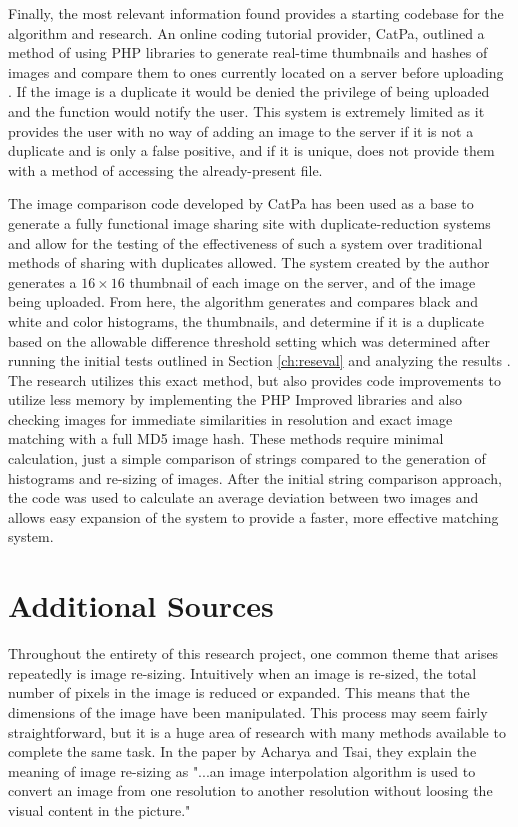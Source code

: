 Finally, the most relevant information found provides a starting codebase for the algorithm and research. An online coding tutorial provider, CatPa, outlined a method of using PHP libraries to generate real-time thumbnails and hashes of images and compare them to ones currently located on a server before uploading \cite{catpa:gdcode}. If the image is a duplicate it would be denied the privilege of being uploaded and the function would notify the user. This system is extremely limited as it provides the user with no way of adding an image to the server if it is not a duplicate and is only a false positive, and if it is unique, does not provide them with a method of accessing the already-present file.

The image comparison code developed by CatPa has been used as a base to generate a fully functional image sharing site with duplicate-reduction systems and allow for the testing of the effectiveness of such a system over traditional methods of sharing with duplicates allowed. The system created by the author \cite{catpa:gdcode} generates a $16\times 16$ thumbnail of each image on the server, and of the image being uploaded. From here, the algorithm generates and compares black and white and color histograms, the thumbnails, and determine if it is a duplicate based on the allowable difference threshold setting which was determined after running the initial tests outlined in Section \ref{ch:reseval} and analyzing the results \cite{catpa:gdcode}. The research utilizes this exact method, but also provides code improvements to utilize less memory by implementing the PHP Improved libraries and also checking images for immediate similarities in resolution and exact image matching with a full MD5 image hash. These methods require minimal calculation, just a simple comparison of strings compared to the generation of histograms and re-sizing of images. After the initial string comparison approach, the code was used to calculate an average deviation between two images and allows easy expansion of the system to provide a faster, more effective matching system.

\section{Additional Sources}
Throughout the entirety of this research project, one common theme that arises repeatedly is image re-sizing. Intuitively when an image is re-sized, the total number of pixels in the image is reduced or expanded. This means that the dimensions of the image have been manipulated. This process may seem fairly straightforward, but it is a huge area of research with many methods available to complete the same task. In the paper by Acharya and Tsai, they explain the meaning of image re-sizing as "...an image interpolation algorithm is used to convert an image from one resolution to another resolution without loosing the visual content in the picture." \cite{Acharya:2007}

